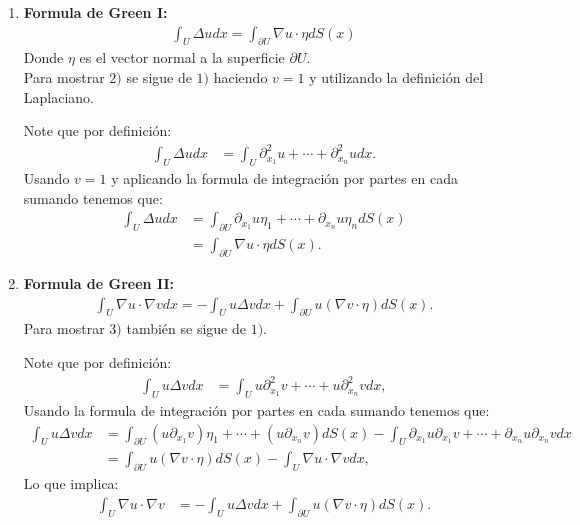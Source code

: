 \begin{homeworkProblem}
\begin{enumerate}
    \newpage
    \item \textbf{Formula de Green I:}
      \begin{align*}
        \int_{U}\Delta u dx=\int_{\partial U}\nabla u\cdot \eta dS(x)
      \end{align*}
      Donde $\eta$ es el vector normal a la superficie $\partial U$.\\
      Para mostrar $2)$ se sigue de $1)$ haciendo $v=1$ y utilizando la definición del Laplaciano.
      \begin{solucion}
        Note que por definición: 
        \begin{align*}
          \int_{U}\Delta udx&=\int_{U}\partial_{x_1}^2u +\cdots +\partial_{x_n}^2 u dx.
        \end{align*}
        Usando $v=1$ y aplicando la formula de integración por partes en cada sumando tenemos que:
        \begin{align*}
          \int_{U}\Delta udx&=\int_{\partial U}\partial_{x_1}u\eta_1+\cdots+\partial_{x_n}u\eta_n dS(x)\\
          &=\int_{\partial U}\nabla u \cdot \eta dS(x).
        \end{align*}
      \end{solucion}
    \item \textbf{Formula de Green II:}
      \begin{align*}
        \int_{U}\nabla u \cdot \nabla v dx=-\int_{U}u\Delta vdx + \int_{\partial U} u(\nabla v\cdot \eta)dS(x).
      \end{align*}
      Para mostrar $3)$ también se sigue de $1)$.
      \begin{solucion}
        Note que por definición:
        \begin{align*}
          \int_{U}u\Delta v dx&=\int_{U}u\partial_{x_1}^2v+\cdots+u\partial_{x_n}^2vdx,
        \end{align*}
        Usando la formula de integración por partes en cada sumando tenemos que:
        \begin{align*}
          \int_{U}u\Delta v dx&=\int_{\partial U}(u\partial_{x_1}v)\eta_1+\cdots+(u\partial_{x_n}v)dS(x)-\int_{U}\partial_{x_1}u\partial_{x_1}v+\cdots+\partial_{x_n}u\partial_{x_n}v dx\\
          &=\int_{\partial U}u(\nabla v\cdot \eta)dS(x) - \int_{U}\nabla u\cdot \nabla v dx,
        \end{align*}
        Lo que implica:
        \begin{align*}
          \int_{U}\nabla u \cdot \nabla v &= -\int_{U}u\Delta v dx + \int_{\partial U} u(\nabla v \cdot \eta)dS(x).

\end{align*}
\end{solucion}
\end{enumerate}
\end{homeworkProblem}
